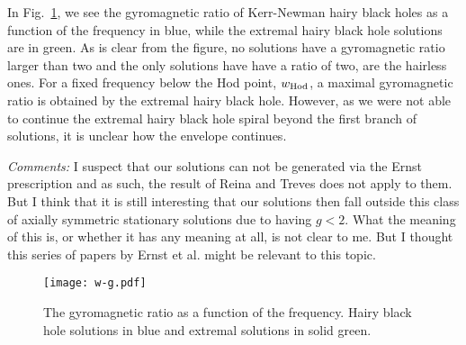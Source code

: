 \documentclass[a4paper]{article}
\begin{document}
In Fig.~\ref{fig:gyro}, we see the gyromagnetic ratio of Kerr-Newman hairy black holes as a function of the frequency in blue, while the extremal hairy black hole solutions are in green.
As is clear from the figure, no solutions have a gyromagnetic ratio larger than two and the only solutions have have a ratio of two, are the hairless ones.
For a fixed frequency below the Hod point, $w_{\rm Hod}$, a maximal gyromagnetic ratio is obtained by the extremal hairy black hole.
However, as we were not able to continue the extremal hairy black hole spiral beyond the first branch of solutions, it is unclear how the envelope continues.

\newpage
\textit{Comments:} I suspect that our solutions can not be generated via the Ernst prescription and as such, the result of Reina and Treves\cite{Reina:1975rt} does not apply to them.
But I think that it is still interesting that our solutions then fall outside this class of axially symmetric stationary solutions due to having $g<2$.
What the meaning of this is, or whether it has any meaning at all, is not clear to me.
But I thought this series of papers by Ernst et al. might be relevant to this topic.

\begin{figure}[H]
  \begin{center}
    \texttt{[image: w-g.pdf]}
  \end{center}
  \caption{The gyromagnetic ratio as a function of the frequency. Hairy black hole solutions in blue and extremal solutions in solid green.}
  \label{fig:gyro}
\end{figure}

    


\end{document}
